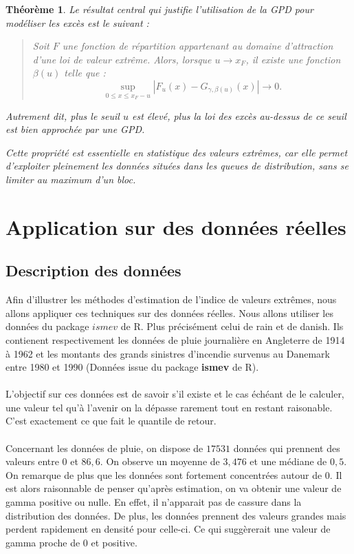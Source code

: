 \documentclass{article}
\theoremstyle{plain}
\theoremstyle{definition}
\theoremstyle{plain}
\newtheorem{theorem}[definition]{Théorème}
\begin{document}
\begin{theorem}

Le résultat central qui justifie l’utilisation de la GPD pour modéliser les excès est le suivant :

\begin{quote}
\noindent Soit \(F\) une fonction de répartition appartenant au domaine d’attraction d’une loi de valeur extrême. Alors, lorsque \(u \to x_F\), il existe une fonction \(\beta(u)\) telle que :
\[
\sup_{0 \leq x \leq x_F - u} \left| F_u(x) - G_{\gamma, \beta(u)}(x) \right| \to 0.
\]
\end{quote}

\noindent Autrement dit, plus le seuil \(u\) est élevé, plus la loi des excès au-dessus de ce seuil est bien approchée par une GPD.

\medskip
\noindent Cette propriété est essentielle en statistique des valeurs extrêmes, car elle permet d’exploiter pleinement les données situées dans les queues de distribution, sans se limiter au maximum d’un bloc.
\end{theorem}
\newpage
\section{Application sur des données réelles}
\subsection{Description des données}

\noindent Afin d'illustrer les méthodes d'estimation de l'indice de valeurs extrêmes, nous allons appliquer ces techniques sur des données réelles.
Nous allons utiliser les données du package $ismev$ de R. Plus précisément celui de rain et de danish. Ils contienent respectivement les données de pluie journalière en Angleterre de 1914 à 1962 et 
les montants des grands sinistres d'incendie survenus au Danemark entre 1980 et 1990 (Données issue du package \textbf{ismev} de R).
\\
\\
L'objectif sur ces données est de savoir s'il existe et le cas échéant de le calculer, une valeur tel qu'à l'avenir on la dépasse rarement tout en restant raisonable. C'est exactement ce que fait le quantile de retour.
\\
\\
Concernant les données de pluie, on dispose de $17531$ données qui prennent des valeurs entre $0$ et $86,6$. On observe un moyenne de $3,476$ et une médiane de $0,5$.
\\
On remarque de plus que les données sont fortement concentrées autour de 0.
Il est alors raisonnable de penser qu'après estimation, on va obtenir une valeur de gamma positive ou nulle. En effet, il n'apparait pas de cassure dans la distribution des données.
De plus, les données prennent des valeurs grandes mais perdent rapidement en densité pour celle-ci. Ce qui suggèrerait une valeur de gamma proche de $0$ et positive.
\end{document}
